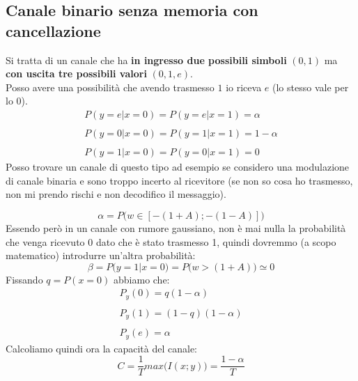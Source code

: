 \documentclass{article}
\begin{document}
\subsection{Canale binario senza memoria con cancellazione}
Si tratta di un canale che ha \textbf{in ingresso due possibili simboli} $(0,1)$ ma \textbf{con uscita tre possibili valori} $(0,1,e)$.\\
Posso avere una possibilità che avendo trasmesso $1$ io riceva $e$ (lo stesso vale per lo $0$).
$$\begin{array}{c}
	P(y=e|x=0)=P(y=e|x=1)=\alpha \\\\
	P(y=0|x=0)=P(y=1|x=1)=1-\alpha \\\\
	P(y=1|x=0)=P(y=0|x=1)=0
\end{array}$$
Posso trovare un canale di questo tipo ad esempio se considero una modulazione di canale binaria e sono troppo incerto al ricevitore (se non so cosa ho trasmesso, non mi prendo rischi e non decodifico il messaggio).
\begin{center}
\end{center}
$$\alpha=P\big(w\in[-(1+A);-(1-A)]\big)$$
Essendo però in un canale con rumore gaussiano, non è mai nulla la probabilità che venga ricevuto 0 dato che è stato trasmesso 1, quindi dovremmo (a scopo matematico) introdurre un'altra probabilità: $$\beta = P\big(y=1|x=0\big)=P\big(w>(1+A)\big)\simeq 0$$
Fissando $q=P(x=0)$ abbiamo che:
$$\begin{array}{c}
	P_y(0)=q(1-\alpha)\\\\
	P_y(1)=(1-q)(1-\alpha)\\\\
	P_y(e)=\alpha
\end{array}$$
Calcoliamo quindi ora la capacità del canale:
$$C=\frac{1}{T}max\big(I(x;y)\big)=\frac{1-\alpha}{T}$$
\end{document}
